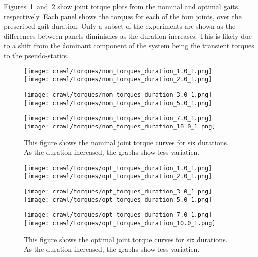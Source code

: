 Figures~\ref{fig:vrep_nom_joint_torques_by_duration1}~and~\ref{fig:vrep_opt_joint_torques_by_duration1}
show joint torque plots from the nominal and optimal gaits, respectively.
Each panel shows the torques for each of the four joints, over the prescribed gait duration.
Only a subset of the experiments are shown as the differences between panels diminishes
as the duration increases. This is likely due to a shift from the dominant component 
of the system being the transient torques to the pseudo-statics.

\begin{figure}
  \centerline{
    \texttt{[image: crawl/torques/nom\_torques\_duration\_1.0\_1.png]}
    \texttt{[image: crawl/torques/nom\_torques\_duration\_2.0\_1.png]}
  }
  \centerline{
    \texttt{[image: crawl/torques/nom\_torques\_duration\_3.0\_1.png]}
    \texttt{[image: crawl/torques/nom\_torques\_duration\_5.0\_1.png]}
  }
  \centerline{
    \texttt{[image: crawl/torques/nom\_torques\_duration\_7.0\_1.png]}
    \texttt{[image: crawl/torques/nom\_torques\_duration\_10.0\_1.png]}
  }
  \caption{This figure shows the nominal joint torque curves for six durations.
           As the duration increased, the graphs show less variation.}
  \label{fig:vrep_nom_joint_torques_by_duration1}
\end{figure}

\begin{figure}
  \centerline{
    \texttt{[image: crawl/torques/opt\_torques\_duration\_1.0\_1.png]}
    \texttt{[image: crawl/torques/opt\_torques\_duration\_2.0\_1.png]}
  }
  \centerline{
    \texttt{[image: crawl/torques/opt\_torques\_duration\_3.0\_1.png]}
    \texttt{[image: crawl/torques/opt\_torques\_duration\_5.0\_1.png]}
  }
  \centerline{
    \texttt{[image: crawl/torques/opt\_torques\_duration\_7.0\_1.png]}
    \texttt{[image: crawl/torques/opt\_torques\_duration\_10.0\_1.png]}
  }
  \caption{This figure shows the optimal joint torque curves for six durations.
           As the duration increased, the graphs show less variation.}
  \label{fig:vrep_opt_joint_torques_by_duration1}
\end{figure}

